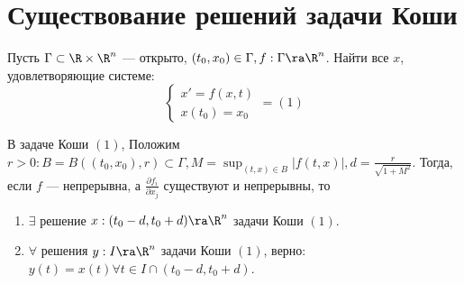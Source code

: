 
\section{Существование решений задачи Коши}
\begin{problem}[Коши]
    Пусть \(\Gamma \subset \R \times \R^n\) --- открыто, \((t_0, x_0) \in \Gamma, f: \Gamma \ra \R^n\).
    Найти все \(x\), удовлетворяющие системе:
    \[\left\{\begin{array}{l}
        x' = f(x, t) \\
        x(t_0) = x_0
    \end{array}\right. = (1)\]
\end{problem}

\begin{theorem}
    В задаче Коши \((1)\), Положим \(r > 0: B = B((t_0, x_0), r) \subset \Gamma, M = \sup_{(t, x) \in B}|f(t, x)|, d = \frac{r}{\sqrt{1 + M^2}}\). Тогда, если \(f\) --- непрерывна, а \(\frac{\partial f_i}{\partial x_j}\) существуют и непрерывны, то 
    \begin{enumerate}
        \item \(\exists\) решение \(x: (t_0 - d, t_0 + d) \ra \R^n\) задачи Коши \((1)\).
        \item \(\forall\) решения \(y: I \ra \R^n\) задачи Коши \((1)\), верно: \(y(t) = x(t) \forall t \in I \cap (t_0 - d, t_0 + d)\).
    \end{enumerate}
\end{theorem}
